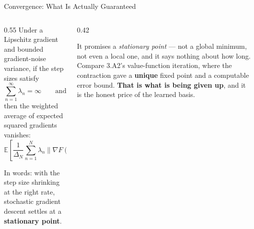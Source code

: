 \begin{frame}{Convergence: What Is Actually Guaranteed}
\begin{columns}[T]
\begin{column}{0.55\textwidth}
\small
Under a Lipschitz gradient and bounded gradient-noise variance, if the step sizes satisfy
\[
  \sum_{n=1}^{\infty}\lambda_n=\infty
  \qquad\text{and}\qquad
  \sum_{n=1}^{\infty}\lambda_n^{2}<\infty ,
\]
then the weighted average of expected squared gradients vanishes:
\[
  \mathbb{E}\!\left[\frac{1}{\Delta_N}\sum_{n=1}^{N}\lambda_n\lVert\nabla F(\theta_n)\rVert^{2}\right]\;\longrightarrow\;0,
  \qquad \Delta_N=\sum_{n=1}^{N}\lambda_n .
\]
\medskip

In words: with the step size shrinking at the right rate, stochastic gradient descent settles at a \textbf{stationary point}.
\end{column}
\begin{column}{0.42\textwidth}
\begin{cautionbox}[title=\textbf{Read the statement carefully}]\small
It promises a \emph{stationary point} --- not a global minimum, not even a local one, and it says nothing about how long.
\medskip
Compare 3.A2's value-function iteration, where the contraction gave a \textbf{unique} fixed point and a computable error bound. \textbf{That is what is being given up}, and it is the honest price of the learned basis.
\end{cautionbox}
\end{column}
\end{columns}
\vspace{1mm}
\end{frame}

